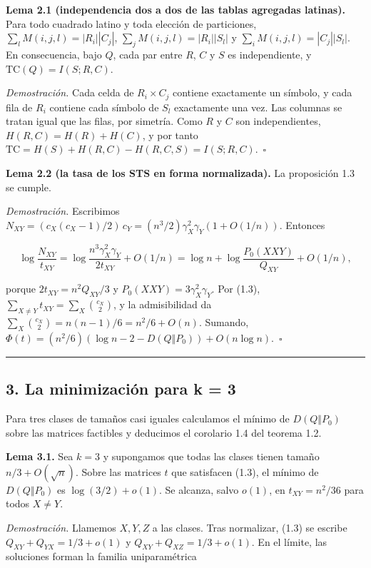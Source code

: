 \documentclass[spanish,11pt,a4paper]{article}
\begin{document}
\textbf{Lema 2.1 (independencia dos a dos de las tablas agregadas latinas).} Para todo cuadrado latino y toda elección de particiones, \(\sum_l M(i,j,l)=|R_i||C_j|\), \(\sum_j M(i,j,l)=|R_i||S_l|\) y \(\sum_i M(i,j,l)=|C_j||S_l|\). En consecuencia, bajo \(Q\), cada par entre \(R\), \(C\) y \(S\) es independiente, y \(\mathrm{TC}(Q)=I(S;R,C)\).

\emph{Demostración.} Cada celda de \(R_i\times C_j\) contiene exactamente un símbolo, y cada fila de \(R_i\) contiene cada símbolo de \(S_l\) exactamente una vez. Las columnas se tratan igual que las filas, por simetría. Como \(R\) y \(C\) son independientes, \(H(R,C)=H(R)+H(C)\), y por tanto \(\mathrm{TC}=H(S)+H(R,C)-H(R,C,S)=I(S;R,C)\).~\(\square\)

\textbf{Lema 2.2 (la tasa de los STS en forma normalizada).} La proposición 1.3 se cumple.

\emph{Demostración.} Escribimos \(N_{XY}=(c_X(c_X-1)/2)\,c_Y=(n^3/2)\gamma_X^2\gamma_Y(1+O(1/n))\). Entonces

\nopagebreak[4]
\[\log\frac{N_{XY}}{t_{XY}}=\log\frac{n^3\gamma_X^2\gamma_Y}{2t_{XY}}+O(1/n)=\log n+\log\frac{P_0(XXY)}{Q_{XY}}+O(1/n),\]

porque \(2t_{XY}=n^2Q_{XY}/3\) y \(P_0(XXY)=3\gamma_X^2\gamma_Y\). Por (1.3), \(\sum_{X\ne Y}t_{XY}=\sum_X\binom{c_X}{2}\), y la admisibilidad da \(\sum_X\binom{c_X}{2}=n(n-1)/6=n^2/6+O(n)\). Sumando, \(\Phi(t)=(n^2/6)(\log n-2-D(Q\Vert P_0))+O(n\log n)\).~\(\square\)

\begin{center}\rule{0.5\linewidth}{0.5pt}\end{center}

\subsection{3. La minimización para k = 3}\label{la-minimizaciuxf3n-para-k-3}

Para tres clases de tamaños casi iguales calculamos el mínimo de \(D(Q\Vert P_0)\) sobre las matrices factibles y deducimos el corolario 1.4 del teorema 1.2.

\textbf{Lema 3.1.} Sea \(k=3\) y supongamos que todas las clases tienen tamaño \(n/3+O(\sqrt n)\). Sobre las matrices \(t\) que satisfacen (1.3), el mínimo de \(D(Q\Vert P_0)\) es \(\log(3/2)+o(1)\). Se alcanza, salvo \(o(1)\), en \(t_{XY}=n^2/36\) para todos \(X\ne Y\).

\emph{Demostración.} Llamemos \(X,Y,Z\) a las clases. Tras normalizar, (1.3) se escribe \(Q_{XY}+Q_{YX}=1/3+o(1)\) y \(Q_{XY}+Q_{XZ}=1/3+o(1)\). En el límite, las soluciones forman la familia uniparamétrica
\end{document}
